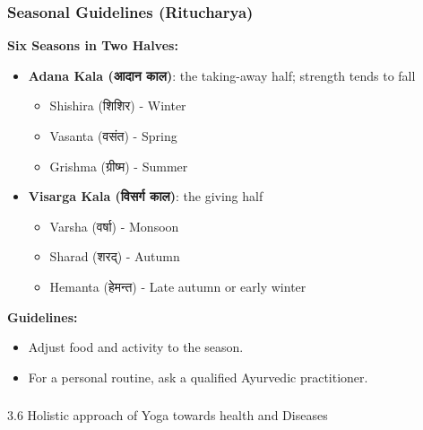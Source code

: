 \begin{frame}[fragile]\frametitle{Seasonal Guidelines (Ritucharya)}
    \textbf{Six Seasons in Two Halves:}
    \begin{itemize}
        \item \textbf{Adana Kala (आदान काल)}: the taking-away half; strength tends to fall
        \begin{itemize}
            \item Shishira (शिशिर) - Winter
            \item Vasanta (वसंत) - Spring
            \item Grishma (ग्रीष्म) - Summer
        \end{itemize}
        \item \textbf{Visarga Kala (विसर्ग काल)}: the giving half
        \begin{itemize}
            \item Varsha (वर्षा) - Monsoon
            \item Sharad (शरद्) - Autumn
            \item Hemanta (हेमन्त) - Late autumn or early winter
        \end{itemize}
    \end{itemize}

    \textbf{Guidelines:}
    \begin{itemize}
        \item Adjust food and activity to the season.
        \item For a personal routine, ask a qualified Ayurvedic practitioner.
    \end{itemize}
\end{frame}

\begin{frame}[fragile]\frametitle{}
\begin{center}
{\Large 3.6 Holistic approach of Yoga towards health and Diseases}
\end{center}
\end{frame}


        
